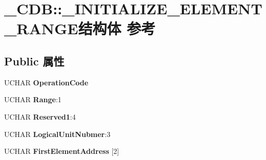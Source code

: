 \hypertarget{struct___c_d_b_1_1___i_n_i_t_i_a_l_i_z_e___e_l_e_m_e_n_t___r_a_n_g_e}{}\section{\+\_\+\+C\+DB\+:\+:\+\_\+\+I\+N\+I\+T\+I\+A\+L\+I\+Z\+E\+\_\+\+E\+L\+E\+M\+E\+N\+T\+\_\+\+R\+A\+N\+G\+E结构体 参考}
\label{struct___c_d_b_1_1___i_n_i_t_i_a_l_i_z_e___e_l_e_m_e_n_t___r_a_n_g_e}
\subsection*{Public 属性}
\begin{DoxyCompactItemize}
\item 
\mbox{\label{struct___c_d_b_1_1___i_n_i_t_i_a_l_i_z_e___e_l_e_m_e_n_t___r_a_n_g_e_ac1372cec6fd31161c45c46ae9b1238ff}} 
U\+C\+H\+AR {\bfseries Operation\+Code}
\item 
\mbox{\label{struct___c_d_b_1_1___i_n_i_t_i_a_l_i_z_e___e_l_e_m_e_n_t___r_a_n_g_e_ade8fce3e274254412fe6a1a3ad80e832}} 
U\+C\+H\+AR {\bfseries Range}\+:1
\item 
\mbox{\label{struct___c_d_b_1_1___i_n_i_t_i_a_l_i_z_e___e_l_e_m_e_n_t___r_a_n_g_e_ab6fed8f0cf991cad58af3e74f3de0cfa}} 
U\+C\+H\+AR {\bfseries Reserved1}\+:4
\item 
\mbox{\label{struct___c_d_b_1_1___i_n_i_t_i_a_l_i_z_e___e_l_e_m_e_n_t___r_a_n_g_e_a66cbfdc5d0cef3c6252cbb411e362c76}} 
U\+C\+H\+AR {\bfseries Logical\+Unit\+Nubmer}\+:3
\item 
\mbox{\label{struct___c_d_b_1_1___i_n_i_t_i_a_l_i_z_e___e_l_e_m_e_n_t___r_a_n_g_e_a1cf05b8a3b111c64d645d6a0fd328611}} 
U\+C\+H\+AR {\bfseries First\+Element\+Address} \mbox{[}2\mbox{]}
\item 
\mbox{\label{struct___c_d_b_1_1___i_n_i_t_i_a_l_i_z_e___e_l_e_m_e_n_t___r_a_n_g_e_a24566d2dbc81628ffd0321cfde63e334}} 

\end{DoxyCompactItemize}
